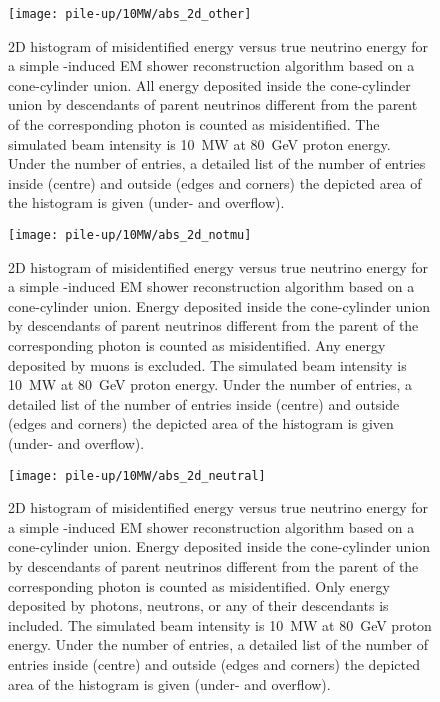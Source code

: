 \begin{figure}[htb]
	\centering
	\texttt{[image: pile-up/10MW/abs\_2d\_other]}
	\caption{2D histogram of misidentified energy versus true neutrino energy for a simple \Pgpz-induced EM shower reconstruction algorithm based on a cone-cylinder union.
		All energy deposited inside the cone-cylinder union by descendants of parent neutrinos different from the parent of the corresponding \Pgpz photon is counted as misidentified.
		The simulated beam intensity is \SI{10}{\mega\watt} at \SI{80}{\giga\electronvolt} proton energy.
		Under the number of entries, a detailed list of the number of entries inside (centre) and outside (edges and corners) the depicted area of the histogram is given (under- and overflow).}
\end{figure}

\begin{figure}[htb]
	\centering
	\texttt{[image: pile-up/10MW/abs\_2d\_notmu]}
	\caption{2D histogram of misidentified energy versus true neutrino energy for a simple \Pgpz-induced EM shower reconstruction algorithm based on a cone-cylinder union.
		Energy deposited inside the cone-cylinder union by descendants of parent neutrinos different from the parent of the corresponding \Pgpz photon is counted as misidentified.
		Any energy deposited by muons is excluded.
		The simulated beam intensity is \SI{10}{\mega\watt} at \SI{80}{\giga\electronvolt} proton energy.
		Under the number of entries, a detailed list of the number of entries inside (centre) and outside (edges and corners) the depicted area of the histogram is given (under- and overflow).}
\end{figure}

\begin{figure}[htb]
	\centering
	\texttt{[image: pile-up/10MW/abs\_2d\_neutral]}
	\caption{2D histogram of misidentified energy versus true neutrino energy for a simple \Pgpz-induced EM shower reconstruction algorithm based on a cone-cylinder union.
		Energy deposited inside the cone-cylinder union by descendants of parent neutrinos different from the parent of the corresponding \Pgpz photon is counted as misidentified.
		Only energy deposited by photons, neutrons, or any of their descendants is included.
		The simulated beam intensity is \SI{10}{\mega\watt} at \SI{80}{\giga\electronvolt} proton energy.
		Under the number of entries, a detailed list of the number of entries inside (centre) and outside (edges and corners) the depicted area of the histogram is given (under- and overflow).}
\end{figure}

